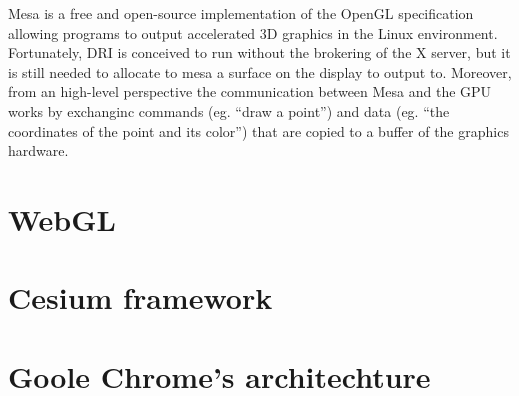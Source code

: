Mesa is a free and open-source implementation of the OpenGL specification allowing
programs to output accelerated 3D graphics in the Linux environment. Fortunately,
DRI is conceived to run without the brokering of the X server, but it is still
needed to allocate to mesa a surface on the display to output to. Moreover, from
an high-level perspective the communication between Mesa and the GPU works by
exchanginc commands (eg. ``draw a point'') and data (eg. ``the coordinates of the
point and its color'') that are copied to a buffer of the graphics hardware.


\section{WebGL} \label{sec:webgl}


\section{Cesium framework}


\section{Goole Chrome's architechture}

